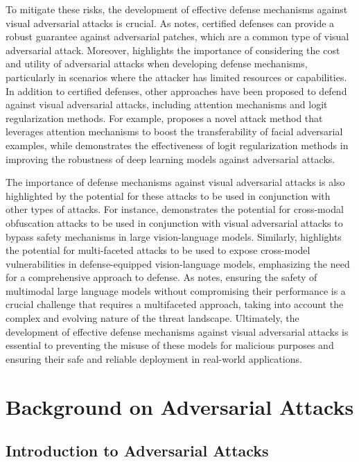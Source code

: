 \documentclass[11pt]{article}
\begin{document}
To mitigate these risks, the development of effective defense mechanisms against visual adversarial attacks is crucial. As \cite{ref5} notes, certified defenses can provide a robust guarantee against adversarial patches, which are a common type of visual adversarial attack. Moreover, \cite{ref19} highlights the importance of considering the cost and utility of adversarial attacks when developing defense mechanisms, particularly in scenarios where the attacker has limited resources or capabilities. In addition to certified defenses, other approaches have been proposed to defend against visual adversarial attacks, including attention mechanisms and logit regularization methods. For example, \cite{ref20} proposes a novel attack method that leverages attention mechanisms to boost the transferability of facial adversarial examples, while \cite{ref21} demonstrates the effectiveness of logit regularization methods in improving the robustness of deep learning models against adversarial attacks.

The importance of defense mechanisms against visual adversarial attacks is also highlighted by the potential for these attacks to be used in conjunction with other types of attacks. For instance, \cite{ref22} demonstrates the potential for cross-modal obfuscation attacks to be used in conjunction with visual adversarial attacks to bypass safety mechanisms in large vision-language models. Similarly, \cite{ref23} highlights the potential for multi-faceted attacks to be used to expose cross-model vulnerabilities in defense-equipped vision-language models, emphasizing the need for a comprehensive approach to defense. As \cite{ref24} notes, ensuring the safety of multimodal large language models without compromising their performance is a crucial challenge that requires a multifaceted approach, taking into account the complex and evolving nature of the threat landscape. Ultimately, the development of effective defense mechanisms against visual adversarial attacks is essential to preventing the misuse of these models for malicious purposes and ensuring their safe and reliable deployment in real-world applications.

\section{Background on Adversarial Attacks}

\subsection{Introduction to Adversarial Attacks}
\end{document}
